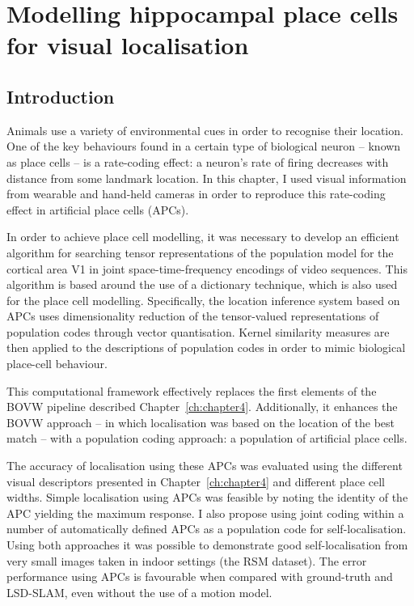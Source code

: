 \chapter{Modelling hippocampal place cells for visual localisation}\label{ch:chapter5} %


\section{Introduction}

Animals use a variety of environmental cues in order to recognise their location.  One of the key behaviours found in a certain type of biological neuron -- known as place cells -- is a rate-coding effect: a neuron's rate of firing decreases with distance from some landmark location. In this chapter, I used visual information from wearable and hand-held cameras in order to reproduce this rate-coding effect in artificial place cells (APCs). 

In order to achieve place cell modelling, it was necessary to develop an efficient algorithm for searching tensor representations of the population model for the cortical area V1 in joint space-time-frequency encodings of video sequences.  This algorithm is based around the use of a dictionary technique, which is also used for the place cell modelling. Specifically, the location inference system based on APCs uses  dimensionality reduction of the tensor-valued representations of  population codes through vector quantisation.  Kernel similarity measures are then applied to the descriptions of population codes in order to mimic biological place-cell behaviour. 

This computational framework effectively replaces the first elements of the BOVW pipeline described Chapter~\ref{ch:chapter4}. Additionally, it enhances the BOVW approach  -- in which localisation was based on the location of the best match -- with a population coding approach: a population of artificial place cells. 

The accuracy of localisation using these APCs was evaluated using the different visual descriptors presented in Chapter~\ref{ch:chapter4} and different place cell widths. Simple localisation using APCs was feasible by noting the identity of the APC yielding the maximum response. I also propose using joint coding within a number of automatically defined APCs as a population code for self-localisation. Using both approaches it was possible to demonstrate good self-localisation from very small images taken in indoor settings (the RSM dataset). The error performance using APCs is favourable when compared with ground-truth and LSD-SLAM, even without the use of a motion model.


